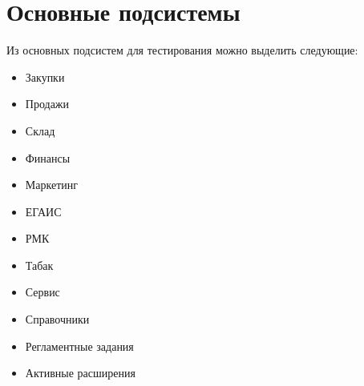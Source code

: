 
\section{Основные подсистемы}

Из основных  подсистем для тестирования можно выделить следующие:
\begin{itemize}
	
\item Закупки
\item Продажи
\item Склад
\item Финансы
\item Маркетинг
\item ЕГАИС
\item РМК
\item Табак
\item Сервис
\item Справочники
\item Регламентные задания
\item Активные расширения

\end{itemize}	


